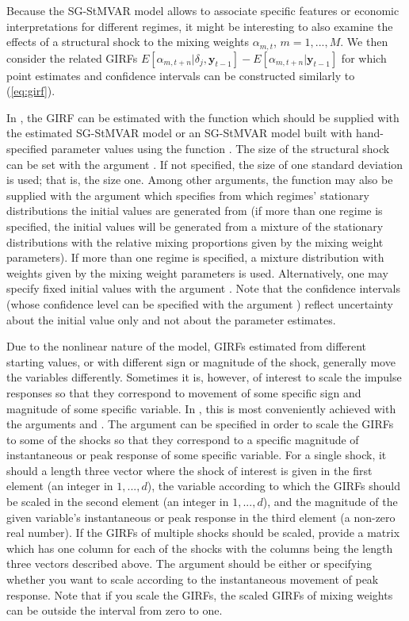\documentclass[nojss]{jss} %
\begin{document}
Because the SG-StMVAR model allows to associate specific features or economic interpretations for different regimes, it might be interesting to also examine the effects of a structural shock to the mixing weights $\alpha_{m,t}$, $m=1,...,M$. We then consider the related GIRFs $E[\alpha_{m,t+n}|\delta_j,\boldsymbol{y}_{t-1}] - E[\alpha_{m,t+n}|\boldsymbol{y}_{t-1}]$ for which point estimates and confidence intervals can be constructed similarly to (\ref{eq:girf}).

In , the GIRF can be estimated with the function  which should be supplied with the estimated SG-StMVAR model or an SG-StMVAR model built with hand-specified parameter values using the function . The size of the structural shock can be set with the argument . If not specified, the size of one standard deviation is used; that is, the size one. Among other arguments, the function may also be supplied with the argument  which specifies from which regimes' stationary distributions the initial values are generated from (if more than one regime is specified, the initial values will be generated from a mixture of the stationary distributions with the relative mixing proportions given by the mixing weight parameters). If more than one regime is specified, a mixture distribution with weights given by the mixing weight parameters is used. Alternatively, one may specify fixed initial values with the argument . Note that the confidence intervals (whose confidence level can be specified with the argument ) reflect uncertainty about the initial value only and not about the parameter estimates.

Due to the nonlinear nature of the model, GIRFs estimated from different starting values, or with different sign or magnitude of the shock, generally move the variables differently. Sometimes it is, however, of interest to scale the impulse responses so that they correspond to movement of some specific sign and magnitude of some specific variable. In , this is most conveniently achieved with the arguments  and . The argument  can be specified in order to scale the GIRFs to some of the shocks so that they correspond to a specific magnitude of instantaneous or peak response of some specific variable. For a single shock, it should a length three vector where the shock of interest is given in the first element (an integer in $1,...,d$), the variable according to which the GIRFs should be scaled in the second element (an integer in $1,...,d$), and the magnitude of the given variable's instantaneous or peak response in the third element (a non-zero real number). If the GIRFs of multiple shocks should be scaled, provide a matrix which has one column for each of the shocks with the columns being the length three vectors described above. The argument  should be either  or  specifying whether you want to scale according to the instantaneous movement of peak response. Note that if you scale the GIRFs, the scaled GIRFs of mixing weights can be outside the interval from zero to one.
\end{document}
